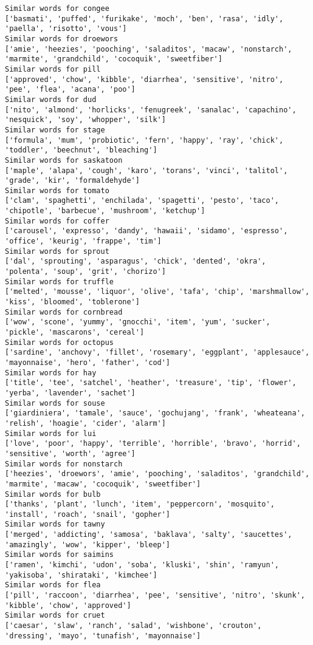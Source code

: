 \documentclass[11pt]{article}
\begin{document}
\begin{Verbatim}[commandchars=\\\{\}]
Similar words for congee
['basmati', 'puffed', 'furikake', 'moch', 'ben', 'rasa', 'idly', 'paella', 'risotto', 'vous']
Similar words for droewors
['amie', 'heezies', 'pooching', 'saladitos', 'macaw', 'nonstarch', 'marmite', 'grandchild', 'cocoquik', 'sweetfiber']
Similar words for pill
['approved', 'chow', 'kibble', 'diarrhea', 'sensitive', 'nitro', 'pee', 'flea', 'acana', 'poo']
Similar words for dud
['nito', 'almond', 'horlicks', 'fenugreek', 'sanalac', 'capachino', 'nesquick', 'soy', 'whopper', 'silk']
Similar words for stage
['formula', 'mum', 'probiotic', 'fern', 'happy', 'ray', 'chick', 'toddler', 'beechnut', 'bleaching']
Similar words for saskatoon
['maple', 'alapa', 'cough', 'karo', 'torans', 'vinci', 'talitol', 'grade', 'kir', 'formaldehyde']
Similar words for tomato
['clam', 'spaghetti', 'enchilada', 'spagetti', 'pesto', 'taco', 'chipotle', 'barbecue', 'mushroom', 'ketchup']
Similar words for coffer
['carousel', 'expresso', 'dandy', 'hawaii', 'sidamo', 'espresso', 'office', 'keurig', 'frappe', 'tim']
Similar words for sprout
['dal', 'sprouting', 'asparagus', 'chick', 'dented', 'okra', 'polenta', 'soup', 'grit', 'chorizo']
Similar words for truffle
['melted', 'mousse', 'liquor', 'olive', 'tafa', 'chip', 'marshmallow', 'kiss', 'bloomed', 'toblerone']
Similar words for cornbread
['wow', 'scone', 'yummy', 'gnocchi', 'item', 'yum', 'sucker', 'pickle', 'mascarons', 'cereal']
Similar words for octopus
['sardine', 'anchovy', 'fillet', 'rosemary', 'eggplant', 'applesauce', 'mayonnaise', 'hero', 'father', 'cod']
Similar words for hay
['title', 'tee', 'satchel', 'heather', 'treasure', 'tip', 'flower', 'yerba', 'lavender', 'sachet']
Similar words for souse
['giardiniera', 'tamale', 'sauce', 'gochujang', 'frank', 'wheateana', 'relish', 'hoagie', 'cider', 'alarm']
Similar words for lui
['love', 'poor', 'happy', 'terrible', 'horrible', 'bravo', 'horrid', 'sensitive', 'worth', 'agree']
Similar words for nonstarch
['heezies', 'droewors', 'amie', 'pooching', 'saladitos', 'grandchild', 'marmite', 'macaw', 'cocoquik', 'sweetfiber']
Similar words for bulb
['thanks', 'plant', 'lunch', 'item', 'peppercorn', 'mosquito', 'install', 'roach', 'snail', 'gopher']
Similar words for tawny
['merged', 'addicting', 'samosa', 'baklava', 'salty', 'saucettes', 'amazingly', 'wow', 'kipper', 'bleep']
Similar words for saimins
['ramen', 'kimchi', 'udon', 'soba', 'kluski', 'shin', 'ramyun', 'yakisoba', 'shirataki', 'kimchee']
Similar words for flea
['pill', 'raccoon', 'diarrhea', 'pee', 'sensitive', 'nitro', 'skunk', 'kibble', 'chow', 'approved']
Similar words for cruet
['caesar', 'slaw', 'ranch', 'salad', 'wishbone', 'crouton', 'dressing', 'mayo', 'tunafish', 'mayonnaise']

\end{Verbatim}
\end{document}
